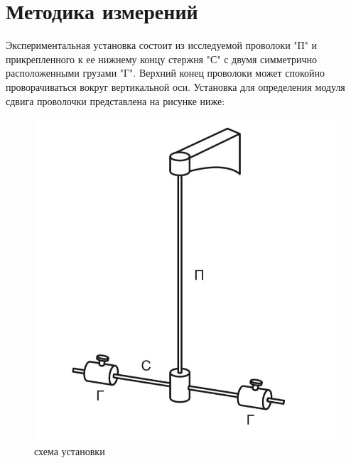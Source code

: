 \documentclass[a4paper,14pt]{extarticle}
\begin{document}
	\section{Методика измерений}
	Экспериментальная установка состоит из исследуемой проволоки "П" и прикрепленного к ее нижнему концу стержня "С" с двумя симметрично расположенными грузами "Г". Верхний конец проволоки может спокойно проворачиваться вокруг вертикальной оси.
	Установка для определения модуля сдвига проволочки представлена на рисунке ниже:
	\begin{figure}[H]
		\begin{center}
			\includegraphics[scale = 0.35]{"ustan_4.jpg"}
			\caption{схема установки}
		\end{center}
	\end{figure}
\end{document}
